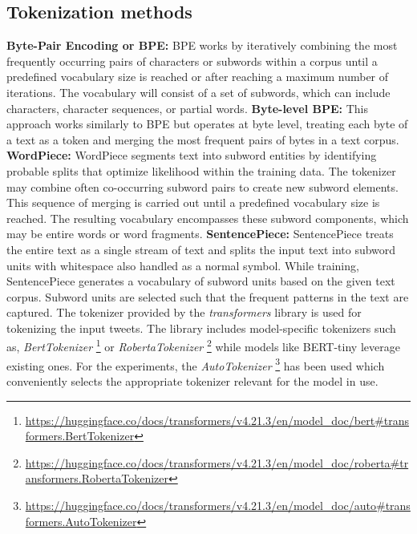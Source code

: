 \subsection{Tokenization methods}
\textbf{Byte-Pair Encoding or BPE:} BPE works by iteratively combining the most frequently occurring pairs of characters or subwords within a corpus until a predefined vocabulary size is reached or after reaching a maximum number of iterations. The vocabulary will consist of a set of subwords, which can include characters, character sequences, or partial words. \newline\newline
\textbf{Byte-level BPE:} This approach works similarly to BPE but operates at byte level, treating each byte of a text as a token and merging the most frequent pairs of bytes in a text corpus. \newline\newline
\textbf{WordPiece:} WordPiece segments text into subword entities by identifying probable splits that optimize likelihood within the training data. The tokenizer may combine often co-occurring subword pairs to create new subword elements. This sequence of merging is carried out until a predefined vocabulary size is reached. The resulting vocabulary encompasses these subword components, which may be entire words or word fragments. \newline\newline
\textbf{SentencePiece:} SentencePiece treats the entire text as a single stream of text and splits the input text into subword units with whitespace also handled as a normal symbol. While training, SentencePiece generates a vocabulary of subword units based on the given text corpus. Subword units are selected such that the frequent patterns in the text are captured.
\newline\newline
The tokenizer provided by the \textit{transformers} library is used for tokenizing the input tweets. The library includes model-specific tokenizers such as, \textit{BertTokenizer} \footnote{\url{https://huggingface.co/docs/transformers/v4.21.3/en/model_doc/bert#transformers.BertTokenizer}} or \textit{RobertaTokenizer} \footnote{\url{https://huggingface.co/docs/transformers/v4.21.3/en/model_doc/roberta#transformers.RobertaTokenizer}} while models like BERT-tiny leverage existing ones. For the experiments, the \textit{AutoTokenizer} \footnote{\url{https://huggingface.co/docs/transformers/v4.21.3/en/model_doc/auto#transformers.AutoTokenizer}} has been used which conveniently selects the appropriate tokenizer relevant for the model in use.


